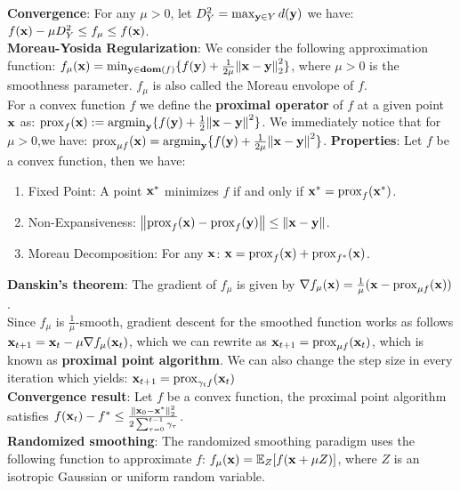 \textbf{Convergence}: For any $\mu > 0$, let $D_Y^2 = \max_{\mathbf{y} \in Y}{d(\mathbf{y})}$ we have: $f(\mathbf{x}) - \mu D_Y^2 \leq f_{\mu} \leq f(\mathbf{x})$. \\
\textbf{Moreau-Yosida Regularization}: We consider the following approximation function: $f_{\mu}(\mathbf{x}) = \min_{\mathbf{y} \in \textbf{dom}(f)} \{f(\mathbf{y}) + \frac{1}{2\mu}\norm{\mathbf{x} - \mathbf{y}}_2^2\}$, where $\mu > 0$ is the smoothness parameter. $f_{\mu}$ is also called the Moreau envolope of $f$. \\
For a convex function $f$ we define the \textbf{proximal operator} of $f$ at a given point $\mathbf{x}$ as: $\mathrm{prox}_f(\mathbf{x}) := \mathrm{argmin}_{\mathbf{y}}\{f(\mathbf{y}) +  \frac{1}{2}\norm{\mathbf{x} - \mathbf{y}}^2 \}$. We immediately notice that for $\mu > 0$,we have: $\mathrm{prox}_{\mu f}(\mathbf{x}) = \mathrm{argmin}_{\mathbf{y}} \{f(\mathbf{y}) + \frac{1}{2 \mu}\norm{\mathbf{x} - \mathbf{y}}^2  \}$.
\textbf{Properties}: Let $f$ be a convex function, then we have:
\begin{enumerate}[label=(\roman*), topsep=0pt,itemsep=0ex,partopsep=0ex,parsep=0ex] 
    \itemsep0em
    \item Fixed Point: A point $\mathbf{x}^*$ minimizes $f$ if and only if $\mathbf{x}^* = \mathrm{prox}_f(\mathbf{x}^*)$.
    \item Non-Expansiveness: $\norm{\mathrm{prox}_f(\mathbf{x}) - \mathrm{prox}_f(\mathbf{y})} \leq \norm{\mathbf{x} - \mathbf{y}}$.
    \item Moreau Decomposition: For any $\mathbf{x}$: $\mathbf{x} = \mathrm{prox}_f(\mathbf{x}) + \mathrm{prox}_{f^*}(\mathbf{x})$.
\end{enumerate}
\textbf{Danskin's theorem}: The gradient of $f_{\mu}$ is given by $\nabla f_{\mu}(\mathbf{x}) = \frac{1}{\mu}(\mathbf{x} - \mathrm{prox}_{\mu f}(\mathbf{x}))$. \\
Since $f_{\mu}$ is $\frac{1}{\mu}$-smooth, gradient descent for the smoothed function works as
follows $\mathbf{x}_{t+1} = \mathbf{x}_t - \mu \nabla f_{\mu}(\mathbf{x}_t)$, which we can rewrite as $\mathbf{x}_{t+1} = \mathrm{prox}_{\mu f}(\mathbf{x}_t)$, which is known as \textbf{proximal point algorithm}. We can also change the step size in every iteration which yields: $\mathbf{x}_{t+1} = \mathrm{prox}_{\gamma_t f}(\mathbf{x}_t)$ \\
\textbf{Convergence result}: Let $f$ be a convex function, the proximal point algorithm satisfies $f(\mathbf{x}_t) - f^* \leq \frac{\norm{\mathbf{x}_0 - \mathbf{x}^*}_2^2}{2 \sum_{\tau=0}^{t-1}{\gamma_{\tau}}}$. \\
\textbf{Randomized smoothing}: The randomized smoothing paradigm uses the following function to approximate $f$: $f_{\mu}(\mathbf{x}) = \mathbb{E}_Z [f(\mathbf{x} + \mu Z) ]$, where $Z$ is an isotropic Gaussian or uniform random variable.\\

